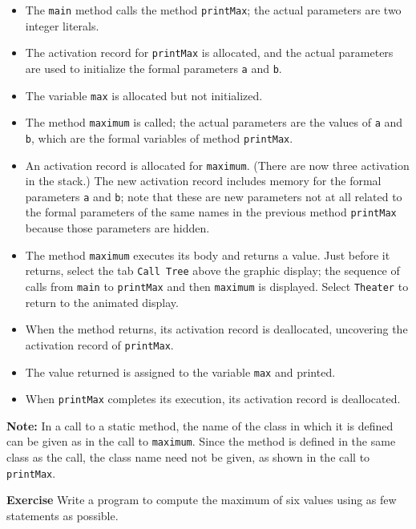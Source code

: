 \begin{itemize}
\item The \texttt{main} method calls the method \texttt{printMax};
the actual parameters are two integer literals.
\item The activation record for \texttt{printMax} is allocated,
and the actual parameters are used to initialize the formal parameters 
\texttt{a} and \texttt{b}.
\item The variable \texttt{max} is allocated but not initialized.
\item The method \texttt{maximum} is called; the actual parameters are the
values of \texttt{a} and \texttt{b}, 
which are the formal variables of method \texttt{printMax}.
\item An activation record is allocated for \texttt{maximum}. (There are now
three activation in the stack.) The new activation record includes
memory for the formal parameters \texttt{a} and \texttt{b}; note that these are
new parameters not at all related to the formal parameters of the same names
in the previous method \texttt{printMax} because those parameters are hidden.
\item The method \texttt{maximum} executes its body and returns a value.
Just before it returns, select the tab \texttt{Call Tree} above the graphic display;
the sequence of calls from \texttt{main} 
to \texttt{printMax} and then \texttt{maximum} is displayed.
Select \texttt{Theater} to return to the animated display.
\item When the method returns, its activation record is deallocated, uncovering the
activation record of \texttt{printMax}. 
\item The value returned is assigned to the variable \texttt{max} and printed.
\item When \texttt{printMax} completes its execution, its activation record
is deallocated.
\end{itemize}
\textbf{Note:} In a call to a static method, the name of the 
class in which it is defined can be given as in the call to \texttt{maximum}.
Since the method is defined in the same class as the call,
the class name need not be given, as shown in the call to \texttt{printMax}.

\textbf{Exercise} Write a program to compute the maximum of six values
using as few statements as possible.
